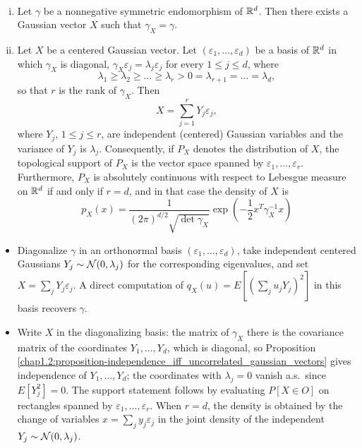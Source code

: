 \begin{theorem}\label{chap1.2:theorem-existence_of_Gaussian_vector_from_symmetric_endomorphism}
 \\
\begin{enumerate}[(i)]
    \item Let $\gamma$ be a nonnegative symmetric endomorphism of $\mathbb{R}^d$. Then there exists a Gaussian vector $X$ such that $\gamma_X=\gamma$.
    \item Let $X$ be a centered Gaussian vector. Let $(\varepsilon_1,...,\varepsilon_d)$ be a basis of $\mathbb{R}^d$ in which $\gamma_X$ is diagonal, $\gamma_X\varepsilon_j=\lambda_j\varepsilon_j$ for every $1 \leq j \leq d$, where
    $$\lambda_1 \geq \lambda_2 \geq ... \geq \lambda_r >0=\lambda_{r+1}=...=\lambda_d,$$
    so that $r$ is the rank of $\gamma_X$. Then
    $$X=\sum_{j=1}^rY_j\varepsilon_j,$$
    where $Y_j$, $1 \leq j \leq r$, are independent (centered) Gaussian variables and the variance of $Y_j$ is $\lambda_j$. Consequently, if $P_X$ denotes the distribution of $X$, the topological support of $P_X$ is the vector space spanned by $\varepsilon_1,...,\varepsilon_r$. Furthermore, $P_X$ is absolutely continuous with respect to Lebesgue measure on $\mathbb{R}^d$ if and only if $r=d$, and in that case the density of $X$ is
    $$p_X(x)=\frac{1}{(2\pi)^{d/2}\sqrt{\det \gamma_X}}\exp\left(-\frac12 x^T\gamma_X^{-1}x\right)$$
\end{enumerate}
\end{theorem}
\begin{proofidea}
\begin{itemize}[(i)]
    \item Diagonalize $\gamma$ in an orthonormal basis $(\varepsilon_1,...,\varepsilon_d)$, take independent centered Gaussians $Y_j \sim \mathcal{N}(0,\lambda_j)$ for the corresponding eigenvalues, and set $X=\sum_jY_j\varepsilon_j$. A direct computation of $q_X(u)=E[(\sum_ju_jY_j)^2]$ in this basis recovers $\gamma$.
    \item Write $X$ in the diagonalizing basis: the matrix of $\gamma_X$ there is the covariance matrix of the coordinates $Y_1,...,Y_d$, which is diagonal, so Proposition \ref{chap1.2:proposition-independence_iff_uncorrelated_gaussian_vectors} gives independence of $Y_1,...,Y_d$; the coordinates with $\lambda_j=0$ vanish a.s.\ since $E[Y_j^2]=0$. The support statement follows by evaluating $P[X \in O]$ on rectangles spanned by $\varepsilon_1,...,\varepsilon_r$. When $r=d$, the density is obtained by the change of variables $x=\sum_jy_j\varepsilon_j$ in the joint density of the independent $Y_j \sim \mathcal{N}(0,\lambda_j)$.
\end{itemize}
\end{proofidea}


